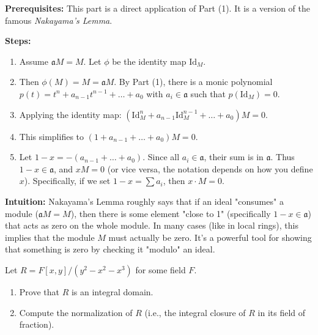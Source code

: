 \begin{solution}
\textbf{Prerequisites:} 
This part is a direct application of Part (1). It is a version of the famous \textit{Nakayama's Lemma}.

\textbf{Steps:}
\begin{enumerate}
    \item Assume $\mathfrak{a}M = M$. Let $\phi$ be the identity map $\mathrm{Id}_M$.
    \item Then $\phi(M) = M = \mathfrak{a}M$. By Part (1), there is a monic polynomial $p(t) = t^n + a_{n-1} t^{n-1} + \dots + a_0$ with $a_i \in \mathfrak{a}$ such that $p(\mathrm{Id}_M) = 0$.
    \item Applying the identity map: $(\mathrm{Id}_M^n + a_{n-1} \mathrm{Id}_M^{n-1} + \dots + a_0) M = 0$.
    \item This simplifies to $(1 + a_{n-1} + \dots + a_0) M = 0$.
    \item Let $1-x = -(a_{n-1} + \dots + a_0)$. Since all $a_i \in \mathfrak{a}$, their sum is in $\mathfrak{a}$. Thus $1-x \in \mathfrak{a}$, and $x M = 0$ (or vice versa, the notation depends on how you define $x$). Specifically, if we set $1-x = \sum a_i$, then $x \cdot M = 0$.
\end{enumerate}

\textbf{Intuition:}
Nakayama's Lemma roughly says that if an ideal "consumes" a module ($\mathfrak{a}M=M$), then there is some element "close to 1" (specifically $1-x \in \mathfrak{a}$) that acts as zero on the whole module. In many cases (like in local rings), this implies that the module $M$ must actually be zero. It's a powerful tool for showing that something is zero by checking it "modulo" an ideal.
\end{solution}

\begin{exercise}
\label{algebra:2020:3}
Let $R = F[x, y]/(y^2 - x^2 - x^3)$ for some field $F$.

\begin{enumerate}
\item Prove that $R$ is an integral domain.

\item Compute the normalization of $R$ (i.e., the integral closure of $R$ in its field of fraction).
\end{enumerate}
\end{exercise}

